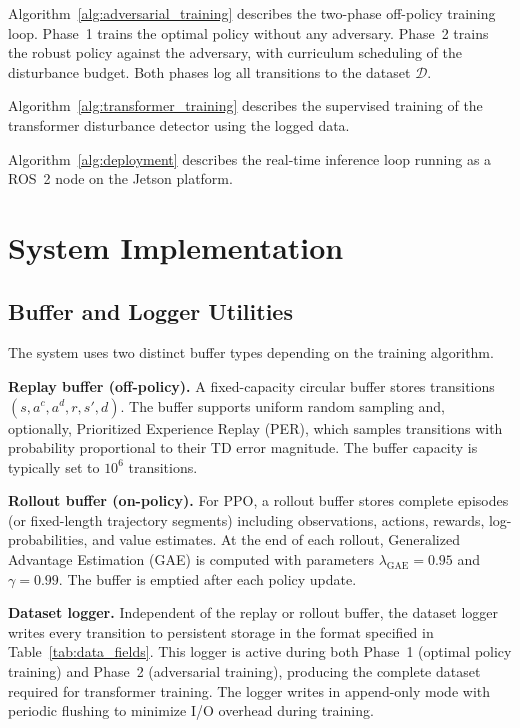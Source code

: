 \documentclass[conference]{IEEEtran}
\newcommand{\cD}{\mathcal{D}}
\begin{document}
Algorithm~\ref{alg:adversarial_training} describes the two-phase off-policy
training loop.  Phase~1 trains the optimal policy without any adversary.
Phase~2 trains the robust policy against the adversary, with curriculum
scheduling of the disturbance budget.  Both phases log all transitions
to the dataset $\cD$.

Algorithm~\ref{alg:transformer_training} describes the supervised training
of the transformer disturbance detector using the logged data.

Algorithm~\ref{alg:deployment} describes the real-time inference loop
running as a ROS~2 node on the Jetson platform.

\section{System Implementation}\label{sec:implementation}

\subsection{Buffer and Logger Utilities}\label{sec:buffers}

The system uses two distinct buffer types depending on the training
algorithm.

\textbf{Replay buffer (off-policy).}  A fixed-capacity circular buffer
stores transitions $(s, a^c, a^d, r, s', d)$.  The buffer supports
uniform random sampling and, optionally, Prioritized Experience Replay
(PER), which samples transitions with probability proportional to their
TD error magnitude.  The buffer capacity is typically set to $10^6$
transitions.

\textbf{Rollout buffer (on-policy).}  For PPO, a rollout buffer stores
complete episodes (or fixed-length trajectory segments) including
observations, actions, rewards, log-probabilities, and value estimates.
At the end of each rollout, Generalized Advantage Estimation (GAE) is
computed with parameters $\lambda_{\text{GAE}} = 0.95$ and $\gamma = 0.99$.
The buffer is emptied after each policy update.

\textbf{Dataset logger.}  Independent of the replay or rollout buffer, the
dataset logger writes every transition to persistent storage in the format
specified in Table~\ref{tab:data_fields}.  This logger is active during
both Phase~1 (optimal policy training) and Phase~2 (adversarial training),
producing the complete dataset required for transformer training.  The
logger writes in append-only mode with periodic flushing to minimize I/O
overhead during training.
\end{document}
